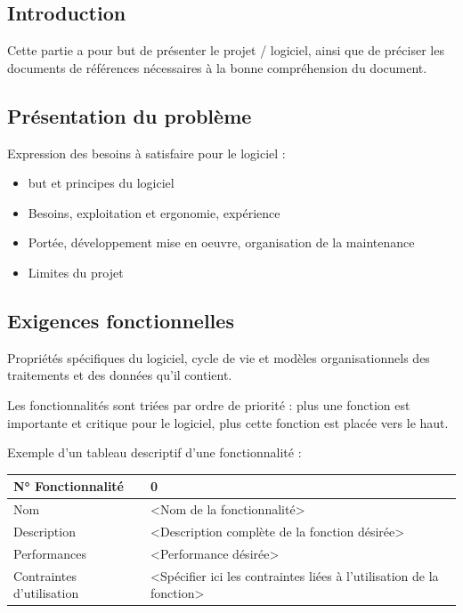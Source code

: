 \documentclass{mise_en_page}
\begin{document}
\subsection[Introduction]{Introduction}
Cette partie a pour but de présenter le projet / logiciel, ainsi que de
préciser les documents de références nécessaires à la bonne
compréhension du document.

\subsection[Présentation du problème]{Présentation du problème}
Expression des besoins à satisfaire pour le logiciel :

\begin{itemize}
\item but et principes du logiciel
\item Besoins, exploitation et ergonomie, expérience
\item Portée, développement mise en oeuvre, organisation de la
maintenance
\item Limites du projet
\end{itemize}

\subsection[Exigences fonctionnelles]{Exigences fonctionnelles}
Propriétés spécifiques du logiciel, cycle de vie et modèles
organisationnels des traitements et des données qu’il contient.

Les fonctionnalités sont triées par ordre de priorité : plus une
fonction est importante et critique pour le logiciel, plus cette
fonction est placée vers le haut.

Exemple d’un tableau descriptif d’une fonctionnalité :

\begin{flushleft}
\tablehead{}
\begin{supertabular}{|m{3.8219998cm}|m{12.324cm}|}
\hline
N° Fonctionnalité &
0\\\hline
Nom &
{\textless}Nom de la fonctionnalité{\textgreater}\\\hline
Description &
{\textless}Description complète de la fonction
désirée{\textgreater}\\\hline
Performances &
{\textless}Performance désirée{\textgreater}\\\hline
Contraintes d’utilisation &
{\textless}Spécifier ici les contraintes liées à l’utilisation de la
fonction{\textgreater}\\\hline
\end{supertabular}
\end{flushleft}
\end{document}

